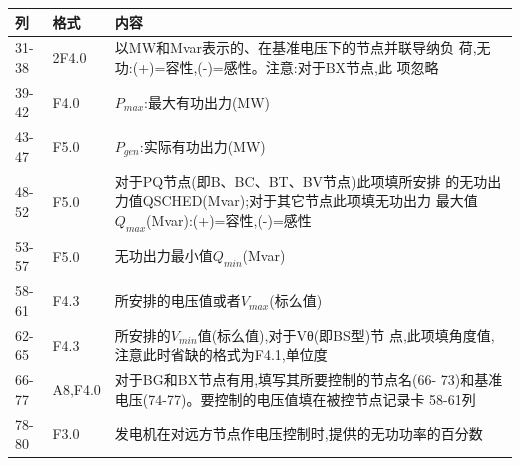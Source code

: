 \begin{spacing}{1.0}
\begin{longtable}[h]{llp{}}
\toprule
列 & 格式 & 内容\\
 \midrule
31-38 & 2F4.0 & 以MW和Mvar表示的、在基准电压下的节点并联导纳负
荷,无功:(+)=容性,(-)=感性。注意:对于BX节点,此 项忽略\\
39-42 & F4.0 & $P_{max}$:最大有功出力(MW)\\
43-47 & F5.0 & $P_{gen}$:实际有功出力(MW)\\
48-52 & F5.0 & 对于PQ节点(即B、BC、BT、BV节点)此项填所安排 的无功出力值QSCHED(Mvar);对于其它节点此项填无功出力 最大值$Q_{max}$(Mvar):(+)=容性,(-)=感性\\
53-57 & F5.0 & 无功出力最小值$Q_{min}$(Mvar)\\
58-61 & F4.3 & 所安排的电压值或者$V_{max}$(标么值)\\
62-65 & F4.3 & 所安排的$V_{min}$值(标么值),对于Vθ(即BS型)节 点,此项填角度值,注意此时省缺的格式为F4.1,单位度\\
66-77 & A8,F4.0  & 对于BG和BX节点有用,填写其所要控制的节点名(66- 73)和基准电压(74-77)。要控制的电压值填在被控节点记录卡 58-61列\\
78-80 & F3.0 & 发电机在对远方节点作电压控制时,提供的无功功率的百分数\\
 
\bottomrule
\end{longtable}
\end{spacing}



